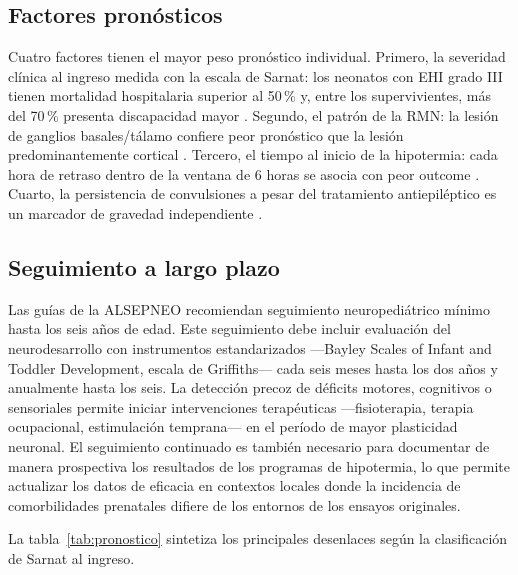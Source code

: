 \documentclass[12pt]{article}
\begin{document}
\subsection{Factores pronósticos}
\label{subsec:factores}

Cuatro factores tienen el mayor peso pronóstico individual. Primero, la severidad
clínica al ingreso medida con la escala de Sarnat: los neonatos con EHI grado III
tienen mortalidad hospitalaria superior al 50\,\% y, entre los supervivientes, más del
70\,\% presenta discapacidad mayor \parencite{sarnat1976}. Segundo, el patrón de la
RMN: la lesión de ganglios basales/tálamo confiere peor pronóstico que la lesión
predominantemente cortical \parencite{ferriero2004}. Tercero, el tiempo al inicio de
la hipotermia: cada hora de retraso dentro de la ventana de 6 horas se asocia con
peor outcome \parencite{shankaran2014}. Cuarto, la persistencia de convulsiones a
pesar del tratamiento antiepiléptico es un marcador de gravedad independiente
\parencite{volpe2012}.

\subsection{Seguimiento a largo plazo}
\label{subsec:seguimiento}

Las guías de la ALSEPNEO \parencite{alsepneo2021} recomiendan seguimiento
neuropediátrico mínimo hasta los seis años de edad. Este seguimiento debe incluir
evaluación del neurodesarrollo con instrumentos estandarizados ---Bayley Scales of
Infant and Toddler Development, escala de Griffiths--- cada seis meses hasta los dos
años y anualmente hasta los seis. La detección precoz de déficits motores, cognitivos
o sensoriales permite iniciar intervenciones terapéuticas ---fisioterapia, terapia
ocupacional, estimulación temprana--- en el período de mayor plasticidad neuronal.
El seguimiento continuado es también necesario para documentar de manera prospectiva
los resultados de los programas de hipotermia, lo que permite actualizar los datos
de eficacia en contextos locales donde la incidencia de comorbilidades prenatales
difiere de los entornos de los ensayos originales.

La tabla~\ref{tab:pronostico} sintetiza los principales desenlaces según la
clasificación de Sarnat al ingreso.
\end{document}
